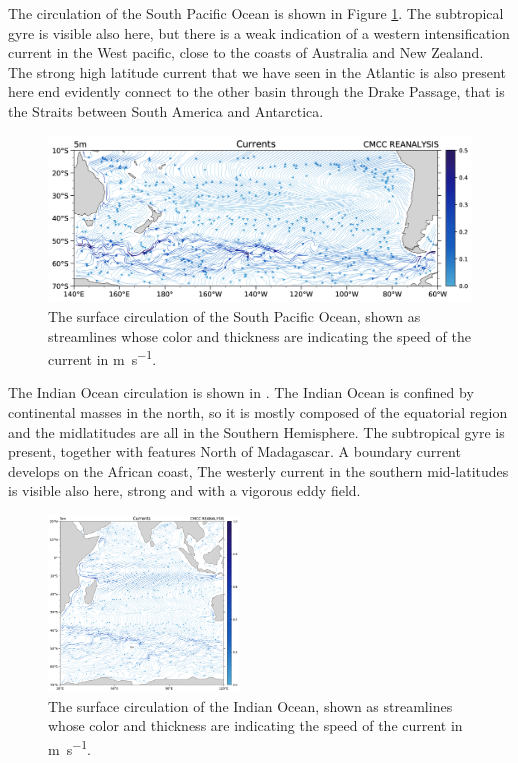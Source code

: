 The circulation of the South Pacific Ocean is shown in Figure \ref{fig:surface-circulation-south-pacific-ocean}.
The subtropical gyre is visible also here, but there is a weak indication of a western intensification current in the West pacific, close to the coasts of Australia and New Zealand.
The strong high latitude current that we have seen in the Atlantic is also present here end evidently connect to the other basin through the Drake Passage, that is the Straits between South America and Antarctica.

\begin{figure}
	\centering
	\includegraphics[width = 0.5 \textwidth]{figs/surface-circulation-south-pacific-ocean}
	\caption{The surface circulation of the South Pacific Ocean, shown as streamlines whose color and thickness are
		indicating the speed of the current in \unit{\meter \per\second}.}
	\label{fig:surface-circulation-south-pacific-ocean}
\end{figure}

The Indian Ocean circulation is shown in \fig{\ref{fig:surface-circulation-indian-ocean}}. The Indian Ocean is confined by continental masses in the north, so it is mostly composed of the equatorial region and the midlatitudes are all in the Southern Hemisphere. The subtropical gyre is present, together with features North of Madagascar. A boundary current develops on the African coast, The westerly current in the southern mid-latitudes is visible also here, strong and with a vigorous eddy field.

\begin{figure}
	\centering
	\includegraphics[width = 0.45\textwidth]{figs/surface-circulation-indian-ocean}
	\caption{The surface circulation of the Indian Ocean, shown as streamlines whose color and thickness are indicating the speed of the current in \unit{\meter \per\second}.}
	\label{fig:surface-circulation-indian-ocean}
\end{figure}

